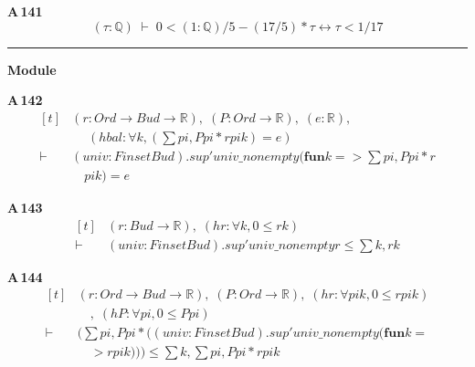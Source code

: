 \noindent\textbf{A\,141}\quad{}
{\footnotesize\[ (\tau : \mathbb{Q} ) \;\vdash\; 0 < (1:\mathbb{Q} )/5 - (17/5) * \tau \leftrightarrow \tau < 1/17 \]}

\vspace{4pt}\noindent\rule{\columnwidth}{0.4pt}\par\vspace{2pt}
\noindent\textbf{Module }\par\vspace{3pt}

\noindent\textbf{A\,142}\quad{}
{\footnotesize\[ \begin{aligned}[t]
&(\mathit{r} : \mathit{Ord} \to \mathit{Bud} \to \mathbb{R} ),\; (\mathit{P} : \mathit{Ord} \to \mathbb{R} ),\; (\mathit{e} : \mathbb{R} ),\\
&\quad \; (\mathit{hbal} : \forall \mathit{k}, (\textstyle\sum \mathit{pi}, \mathit{P} \mathit{pi} * \mathit{r} \mathit{pi} \mathit{k}) = \mathit{e})\\
\vdash\;&(\mathit{univ} : \mathit{Finset} \mathit{Bud}).\mathit{sup'} \mathit{univ\_nonempty} (\mathbf{fun} \mathit{k} => \textstyle\sum \mathit{pi}, \mathit{P} \mathit{pi} * \mathit{r}\\
&\quad \mathit{pi} \mathit{k}) = \mathit{e}
\end{aligned} \]}

\noindent\textbf{A\,143}\quad{}
{\footnotesize\[ \begin{aligned}[t]
&(\mathit{r} : \mathit{Bud} \to \mathbb{R} ),\; (\mathit{hr} : \forall \mathit{k}, 0 \leq \mathit{r} \mathit{k})\\
\vdash\;&(\mathit{univ} : \mathit{Finset} \mathit{Bud}).\mathit{sup'} \mathit{univ\_nonempty} \mathit{r} \leq \textstyle\sum \mathit{k}, \mathit{r} \mathit{k}
\end{aligned} \]}

\noindent\textbf{A\,144}\quad{}
{\footnotesize\[ \begin{aligned}[t]
&(\mathit{r} : \mathit{Ord} \to \mathit{Bud} \to \mathbb{R} ),\; (\mathit{P} : \mathit{Ord} \to \mathbb{R} ),\; (\mathit{hr} : \forall \mathit{pi} \mathit{k}, 0 \leq \mathit{r} \mathit{pi} \mathit{k})\\
&\quad ,\; (\mathit{hP} : \forall \mathit{pi}, 0 \leq \mathit{P} \mathit{pi})\\
\vdash\;&(\textstyle\sum \mathit{pi}, \mathit{P} \mathit{pi} * ((\mathit{univ} : \mathit{Finset} \mathit{Bud}).\mathit{sup'} \mathit{univ\_nonempty} (\mathbf{fun} \mathit{k} =\\
&\quad > \mathit{r} \mathit{pi} \mathit{k}))) \leq \textstyle\sum \mathit{k}, \textstyle\sum \mathit{pi}, \mathit{P} \mathit{pi} * \mathit{r} \mathit{pi} \mathit{k}
\end{aligned} \]}


